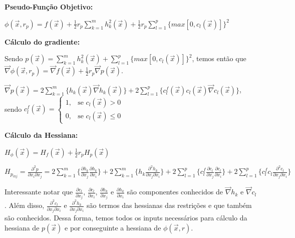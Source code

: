 \documentclass[10pt, a4paper]{article}
\begin{document}
\textbf{Pseudo-Função Objetivo:}

\vspace{3mm}
$\phi(\overrightarrow{x}, r_p) = f(\overrightarrow{x}) + \frac{1}{2} r_p \sum_{k=1}^{m} h_k^2(\overrightarrow{x}) 
+ \frac{1}{2} r_p \sum_{l=1}^{p} \{max[0, c_l(\overrightarrow{x})]\}^2$

\vspace{5mm}
\textbf{Cálculo do gradiente:}

\vspace{3mm}
Sendo $p(\overrightarrow{x}) = \sum_{k=1}^{m} h_k^2(\overrightarrow{x}) + \sum_{l=1}^{p}\{max[0,c_l(\overrightarrow{x})]\}^2$, temos então que
$\overrightarrow{\nabla} \phi(\overrightarrow{x}, r_p) = \overrightarrow{\nabla} f(\overrightarrow{x}) + 
\frac{1}{2} r_p \overrightarrow{\nabla} p(\overrightarrow{x})$.

\vspace{3mm}
$\overrightarrow{\nabla} p(\overrightarrow{x}) = 2\sum_{k=1}^{m} \{h_k(\overrightarrow{x}) \overrightarrow{\nabla} h_k(\overrightarrow{x}) \}
+ 2\sum_{l=1}^{p} \{c_{l}^{f}(\overrightarrow{x}) c_l(\overrightarrow{x}) \overrightarrow{\nabla} c_l(\overrightarrow{x}) \} $,
sendo $c_l^f(\overrightarrow{x}) =
\begin{cases}
  1,& \text{se } c_l(\overrightarrow{x}) > 0 \\
  0,              & \text{se } c_l(\overrightarrow{x}) \leq 0
\end{cases}$

\vspace{5mm}
\textbf{Cálculo da Hessiana:}

\vspace{3mm}
$H_{\phi}(\overrightarrow{x}) = H_f(\overrightarrow{x}) + \frac{1}{2} r_p H_p(\overrightarrow{x})$

\vspace{3mm}
$H_{p_{i\text{x}j}} = \frac{\partial ^2 p}{\partial x_i \partial x_j} = 
2\sum_{k=1}^{m} \{\frac{\partial h_k}{\partial x_j} \frac{\partial h_k}{\partial x_i}\} 
+ 2\sum_{k=1}^{m} \{h_k \frac{\partial ^2 h_k}{\partial x_j \partial x_i}\}
+2\sum_{l=1}^{p} \{c_l^f \frac{\partial c_l}{\partial x_j} \frac{\partial c_l}{\partial x_i}\}
+ 2\sum_{l=1}^{p} \{c_l^f c_l \frac{\partial ^2 c_l}{\partial x_j \partial x_i}\}$

\vspace{3mm}
Interessante notar que $\frac{\partial c_l}{\partial x_j}$,
$\frac{\partial c_l}{\partial x_i}$,
$\frac{\partial h_k}{\partial x_j}$ e
 $\frac{\partial h_k}{\partial x_i}$ são componentes conhecidos de 
$\overrightarrow{\nabla} h_k$ e $\overrightarrow{\nabla} c_l$. Além disso,
$\frac{\partial ^2 c_l}{\partial x_j \partial x_i}$ 
e $\frac{\partial ^2 h_k}{\partial x_j \partial x_i}$
são termos das hessianas das restrições e que também são conhecidos.
Dessa forma, temos todos os inputs necessários para cálculo da hessiana de 
$p(\overrightarrow{x})$ e por conseguinte a hessiana de 
$\phi(\overrightarrow{x}, r)$.
\end{document}
